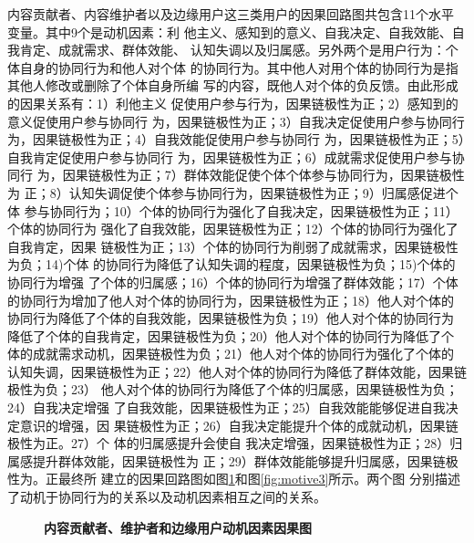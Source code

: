 内容贡献者、内容维护者以及边缘用户这三类用户的因果回路图共包含11个水平
变量。其中9个是动机因素：利
他主义、感知到的意义、自我决定、自我效能、自我肯定、成就需求、群体效能、
认知失调以及归属感。另外两个是用户行为：个体自身的协同行为和他人对个体
的协同行为。其中他人对用个体的协同行为是指其他人修改或删除了个体自身所编
写的内容，既他人对个体的负反馈。由此形成的因果关系有：1）利他主义
促使用户参与行为，因果链极性为正；2）感知到的意义促使用户参与协同行
为，因果链极性为正；3）自我决定促使用户参与协同行
为，因果链极性为正；4）自我效能促使用户参与协同行
为，因果链极性为正；5）自我肯定促使用户参与协同行
为，因果链极性为正；6）成就需求促使用户参与协同行
为，因果链极性为正；7）群体效能促使个体个体参与协同行为，因果链极性为
正；8）认知失调促使个体参与协同行为，因果链极性为正；9）归属感促进个体
参与协同行为；10）个体的协同行为强化了自我决定，因果链极性为正；11）个体的协同行为
强化了自我效能，因果链极性为正；12）个体的协同行为强化了自我肯定，因果
链极性为正；13）个体的协同行为削弱了成就需求，因果链极性为负；14)个体
的协同行为降低了认知失调的程度，因果链极性为负；15)个体的协同行为增强
了个体的归属感；16）个体的协同行为增强了群体效能；17）个体
的协同行为增加了他人对个体的协同行为，因果链极性为正；18）他人对个体的
协同行为降低了个体的自我效能，因果链极性为负；19）他人对个体的协同行为
降低了个体的自我肯定，因果链极性为负；20）他人对个体的协同行为降低了个
体的成就需求动机，因果链极性为负；21）他人对个体的协同行为强化了个体的
认知失调，因果链极性为正；22）他人对个体的协同行为降低了群体效能，因果链极性为负；23）
他人对个体的协同行为降低了个体的归属感，因果链极性为负；24）自我决定增强
了自我效能，因果链极性为正；25）自我效能能够促进自我决定意识的增强，因
果链极性为正；26）自我决定能提升个体的成就动机，因果链极性为正。27）个
体的归属感提升会使自
我决定增强，因果链极性为正；28）归属感提升群体效能，因果链极性为
正；29）群体效能能够提升归属感，因果链极性为。正最终所
建立的因果回路图如图\ref{fig:motive2}和图\ref{fig:motive3}所示。两个图
分别描述了动机于协同行为的关系以及动机因素相互之间的关系。

\begin{figure}[!htb]
  \centering
  \caption{\small{\textbf{内容贡献者、维护者和边缘用户动机因素因果图}}}
  \label{fig:motive2}
\end{figure}


